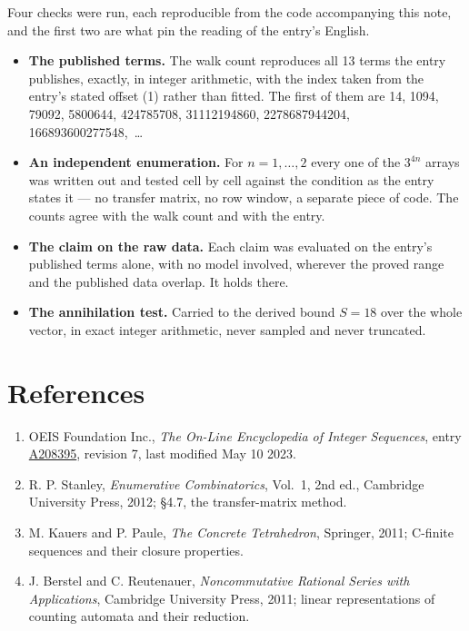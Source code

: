 \documentclass[11pt]{article}
\theoremstyle{definition}
\begin{document}
Four checks were run, each reproducible from the code accompanying this note, and the first two are what pin the reading of the entry's English.

\begin{itemize}

\item {\bfseries The published terms.} The walk count reproduces all 13 terms the entry publishes, exactly, in integer arithmetic, with the index taken from the entry's stated offset (1) rather than fitted. The first of them are 14, 1094, 79092, 5800644, 424785708, 31112194860, 2278687944204, 166893600277548,~\dots

\item {\bfseries An independent enumeration.} For $n = 1,\dots,2$ every one of the $3^{4n}$ arrays was written out and tested cell by cell against the condition as the entry states it --- no transfer matrix, no row window, a separate piece of code. The counts agree with the walk count and with the entry.

\item {\bfseries The claim on the raw data.} Each claim was evaluated on the entry's published terms alone, with no model involved, wherever the proved range and the published data overlap. It holds there.

\item {\bfseries The annihilation test.} Carried to the derived bound $S = 18$ over the whole vector, in exact integer arithmetic, never sampled and never truncated.

\end{itemize}

\section{References}

\begin{enumerate}

\item OEIS Foundation Inc., \emph{The On-Line Encyclopedia of Integer Sequences}, entry \href{https://oeis.org/A208395}{A208395}, revision 7, last modified May 10 2023.

\item R. P. Stanley, \emph{Enumerative Combinatorics}, Vol.~1, 2nd ed., Cambridge University Press, 2012; \S4.7, the transfer-matrix method.

\item M. Kauers and P. Paule, \emph{The Concrete Tetrahedron}, Springer, 2011; C-finite sequences and their closure properties.

\item J. Berstel and C. Reutenauer, \emph{Noncommutative Rational Series with Applications}, Cambridge University Press, 2011; linear representations of counting automata and their reduction.

\end{enumerate}
\end{document}
